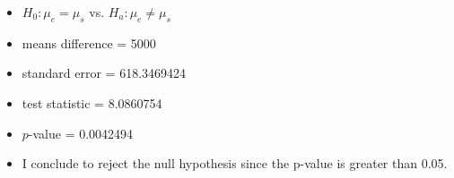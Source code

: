 \documentclass[11pt]{book}\usepackage[]{graphicx}\usepackage[]{color}
\begin{document}
\begin{exercises}
\begin{exercise}
\end{exercise}
\begin{solution}  %

\begin{itemize}
  \item $H_0: \mu_e = \mu_s$ vs. $H_a: \mu_e \ne \mu_s$
  \item  means difference = 5000
  \item  standard error  = 618.3469424
  \item  test statistic = 8.0860754
  \item  $p$-value = 0.0042494
  \item  I conclude to reject the null hypothesis since the p-value is greater than 0.05.
\end{itemize}

\end{solution}



\end{exercises}
\end{document}
